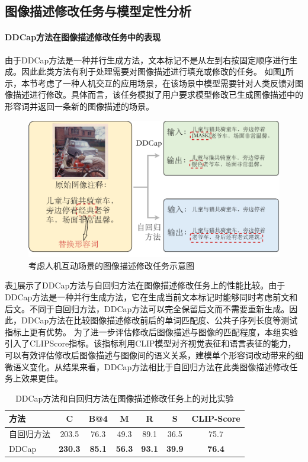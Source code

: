 \subsection{图像描述修改任务与模型定性分析}



\paragraph{DDCap方法在图像描述修改任务中的表现}
由于DDCap方法是一种并行生成方法，文本标记不是从左到右按固定顺序进行生成。因此此类方法有利于处理需要对图像描述进行填充或修改的任务。
如图\ref{fig:ddcap-modification-task}所示，本节考虑了一种人机交互的应用场景，在该场景中模型需要针对人类反馈对图像描述进行修改。具体而言，该任务模拟了用户要求模型修改已生成图像描述中的形容词并返回一条新的图像描述的场景。%
\begin{figure}
  \centering
  \includegraphics[width=0.8\linewidth]{figures/ddcap-modification-task.pdf}
  \caption{考虑人机互动场景的图像描述修改任务示意图}
  \label{fig:ddcap-modification-task}
\end{figure}

表\ref{tab:ddcap-infill}展示了DDCap方法与自回归方法在图像描述修改任务上的性能比较。由于DDCap方法是一种并行生成方法，它在生成当前文本标记时能够同时考虑前文和后文。不同于自回归方法，DDCap方法可以完全保留后文而不需要重新生成。因此，DDCap方法在比较图像描述修改前后的单词匹配度、公共子序列长度等测试指标上更有优势。
为了进一步评估修改后图像描述与图像的匹配程度，本组实验引入了CLIPScore\cite{CLIPScore}指标。该指标利用CLIP模型对齐视觉表征和语言表征的能力，可以有效评估修改后图像描述与图像间的语义关系，建模单个形容词改动带来的细微语义变化。从结果来看，DDCap方法相比于自回归方法在此类图像描述修改任务上效果更佳。
\begin{table}
  \centering
  \caption{DDCap方法和自回归方法在图像描述修改任务上的对比实验}
  \begin{tabular}{lcccccc}
    \toprule
    方法 & C & B@4 & M & R & S & CLIP-Score\\
    \midrule
    自回归方法 & 203.5 & 76.3  & 49.3 &89.1& 36.5 & 75.7\\
    DDCap & \textbf{230.3} & \textbf{85.1}  &  \textbf{56.3} & \textbf{93.1} & \textbf{39.9} & \textbf{76.4}\\
    \bottomrule
  \end{tabular}
  \label{tab:ddcap-infill}
\end{table}

